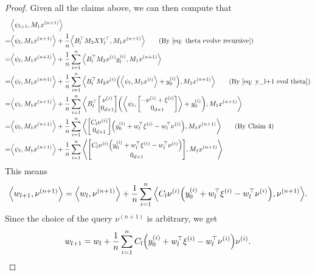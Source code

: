\documentclass{article}
\newcommand{\explain}[1]{\tag*{(#1)}}
\newcommand{\indot}[2]{{\left<#1, #2\right>}}
\begin{document}
\begin{proof}
    Given all the claims above,
    we can then compute that
    \begin{align}
        &\indot{\psi_{l+1}}{M_1 x^{(n+1)}}\\ 
        =&\indot{\psi_l}{M_1 x^{(n+1)}} + \frac{1}{n}\indot{B_l^\top M_2 X Y_l^\top}{M_1 x^{(n+1)}} \explain{By~\eqref{eq: theta evolve recursive}}\\
        =&\indot{\psi_l}{M_1 x^{(n+1)}} + \frac{1}{n}\sum_{i=1}^n \indot{B_l^\top M_2 x^{(i)} y_l^{(i)}}{M_1 x^{(n+1)}}\\
        =&\indot{\psi_l}{M_1 x^{(n+1)}} + 
        \frac{1}{n} \sum_{i=1}^n \indot{B_l^\top M_2 x^{(i)} \qty(\indot{\psi_l}{M_1 x^{(i)}} + y_0^{(i)})}{M_1 x^{(n+1)}} \explain{By \eqref{eq: y_l+1 evol theta}}\\
        =&\indot{\psi_l}{M_1 x^{(n+1)}} + 
        \frac{1}{n} \sum_{i=1}^n 
        \indot{B_l^\top \mqty[\nu^{(i)}\\0_{d\times 1}] 
        \qty( \indot{\psi_l}{\mqty[-\nu^{(i)} + \xi^{(i)}\\ 0_{d\times 1}]} + y_0^{(i)})}{M_1 x^{(n+1)}}\\
        =&\indot{\psi_l}{M_1 x^{(n+1)}} + 
        \frac{1}{n} \sum_{i=1}^n 
        \indot{\mqty[C_l \nu^{(i)}\\0_{d\times 1}] 
        \qty( y_0^{(i)} +  w_l^\top \xi^{(i)} - w_l^\top \nu^{(i)} )}{M_1 x^{(n+1)}} \explain{By Claim 4}\\
        =&\indot{\psi_l}{M_1 x^{(n+1)}} + 
        \frac{1}{n} \sum_{i=1}^n 
        \indot{\mqty[C_l \nu^{(i)} \qty(y_0^{(i)} + w_l^\top \xi^{(i)} - w_l^\top \nu^{(i)})\\0_{d\times 1}]}
        {M_1 x^{(n+1)}}\\
    \end{align}
    This means
    \begin{align}
        \indot{w_{l+1}}{\nu^{(n+1)}} 
        = \indot{w_l}{\nu^{(n+1)}}
        + \frac{1}{n} \sum_{i=1}^n 
        \indot{C_l \nu^{(i)} \qty(y_0^{(i)} + w_l^\top \xi^{(i)} - w_l^\top \nu^{(i)})}{
        \nu^{(n+1)}}.
    \end{align}
    Since the choice of the query $\nu^{(n+1)}$ is arbitrary, we get 
    \begin{align}
        w_{l+1} = w_l + \frac{1}{n}\sum_{i=1}^n C_l \qty(y_0^{(i)} + w_l^\top \xi^{(i)} - w_l^\top \nu^{(i)}) \nu^{(i)}.
    \end{align}


\end{proof}
\end{document}

